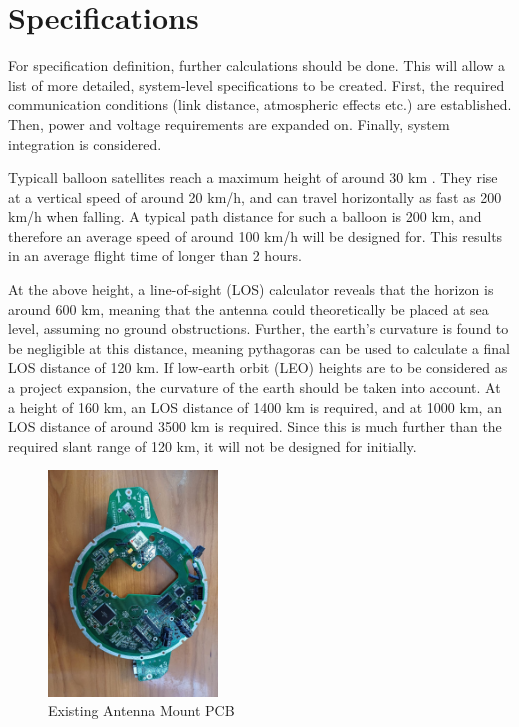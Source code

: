 \graphicspath{{./figures}}

\section{Specifications}

For specification definition, further calculations should be done. This will allow a list of more detailed, system-level specifications to be created. First, the required communication conditions (link distance, atmospheric effects etc.) are established. Then, power and voltage requirements are expanded on. Finally, system integration is considered.

Typicall balloon satellites reach a maximum height of around 30 km \cite{site-weatherWeatherBalloons}. They rise at a vertical speed of around 20 km/h, and can travel horizontally as fast as 200 km/h when falling. A typical path distance for such a balloon is 200 km, and therefore an average speed of around 100 km/h will be designed for. This results in an average flight time of longer than 2 hours.

At the above height, a line-of-sight (LOS) calculator reveals that the horizon is around 600 km, meaning that the antenna could theoretically be placed at sea level, assuming no ground obstructions. Further, the earth's curvature is found to be negligible at this distance, meaning pythagoras can be used to calculate a final LOS distance of 120 km. If low-earth orbit (LEO) heights are to be considered as a project expansion, the curvature of the earth should be taken into account. At a height of 160 km, an LOS distance of 1400 km is required, and at 1000 km, an LOS distance of around 3500 km is required. Since this is much further than the required slant range of 120 km, it will not be designed for initially.

\begin{figure}[!htb]
    \centering
    \includegraphics[width=0.4\textwidth, angle=90, origin=c]{gs_existing}
    \caption{Existing Antenna Mount PCB}
    \label{fig:gs_existing}
\end{figure}

